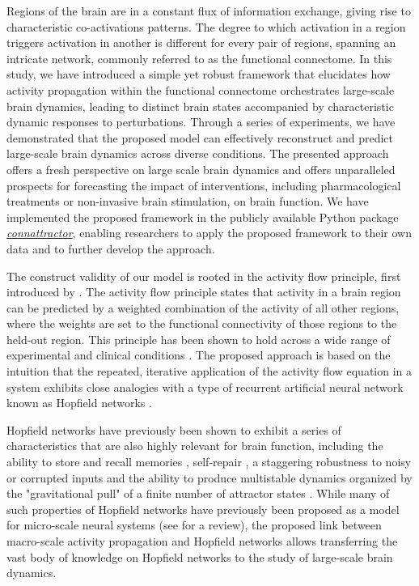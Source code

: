 \documentclass{article}
\begin{document}
Regions of the brain are in a constant flux of information exchange, giving rise to characteristic co-activations patterns.
The degree to which activation in a region triggers activation in another is different for every pair of regions, spanning an intricate network, commonly referred to as the functional connectome.
In this study, we have introduced a simple yet robust framework that elucidates how activity propagation within the functional connectome orchestrates large-scale brain dynamics, leading to distinct brain states accompanied by characteristic dynamic responses to perturbations.
Through a series of experiments, we have demonstrated that the proposed model can effectively reconstruct and predict large-scale brain dynamics across diverse conditions.
The presented approach offers a fresh perspective on large scale brain dynamics and offers unparalleled prospects for forecasting the impact of interventions, including pharmacological treatments or non-invasive brain stimulation, on brain function.
We have implemented the proposed framework in the publicly available Python package \href{https://pni-lab.github.io/connattractor/quickstart}{\textit{connattractor}}, enabling researchers to apply the proposed framework to their own data and to further develop the approach.

The construct validity of our model is rooted in the activity flow principle, first introduced by
\citet{cole2016activity}. The activity flow principle states that activity in a brain region can be predicted by a weighted combination of the activity of all other regions, where the weights are set to the functional connectivity of those regions to the held-out region. This principle has been shown to hold across a wide range of experimental and clinical conditions
\citep{cole2016activity, ito2017cognitive, mill2022network, hearne2021activity, chen2018human}.
The proposed approach is based on the intuition that the repeated, iterative application of the activity flow equation in a system exhibits close analogies with a type of recurrent artificial neural network known as Hopfield networks \citep{hopfield1982neural}.

Hopfield networks have previously been shown to exhibit a series of characteristics that are also highly relevant for
brain function, including the ability to store and recall memories \citep{hopfield1982neural}, self-repair \citep{murre2003selfreparing},
a staggering robustness to noisy or corrupted inputs \citep{hertz1991introduction} and the ability to produce
multistable dynamics organized by the "gravitational pull" of a finite number of attractor states
\citep{khona2022attractor}. While many of such properties of Hopfield networks have previously been proposed as a model for micro-scale neural systems (see \cite{khona2022attractor} for a review), the proposed link between macro-scale activity propagation and Hopfield networks allows transferring the vast body of knowledge on Hopfield networks to the study of large-scale brain dynamics.
\end{document}
